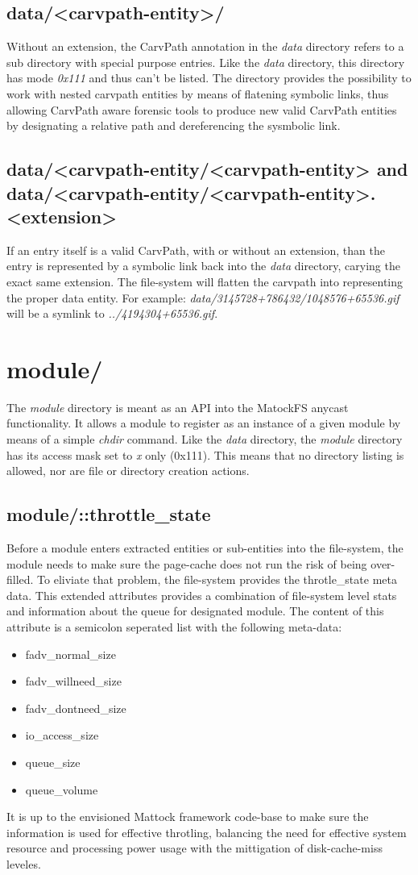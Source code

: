 \subsection{data/<carvpath-entity>/}
Without an extension, the CarvPath annotation in the \emph{data} directory refers to a sub directory with special purpose entries. Like the \emph{data} directory, this directory has mode \emph{0x111} and thus can't be listed. The directory provides the possibility to work with nested carvpath entities by means of flatening symbolic links, thus allowing CarvPath aware forensic tools to produce new valid CarvPath entities by designating a relative path and dereferencing the sysmbolic link.
\subsection{data/<carvpath-entity/<carvpath-entity> and data/<carvpath-entity/<carvpath-entity>.<extension>}
If an entry itself is a valid CarvPath, with or without an extension, than the entry is represented by a symbolic link back into the \emph{data} directory, carying the exact same extension. The file-system will flatten the carvpath into representing the proper data entity. For example: \emph{data/3145728+786432/1048576+65536.gif} will be a symlink to \emph{../4194304+65536.gif}.
\section{module/}
The \emph{module} directory is meant as an API into the MatockFS anycast functionality. It allows a module to register as an instance of a given module by means of a simple \emph{chdir} command. Like the \emph{data} directory, the \emph{module} directory has its access mask set to \emph{x} only (0x111). This means that no directory listing is allowed, nor are file or directory creation actions.  
\subsection{module/::throttle\_state}
Before a module enters extracted entities or sub-entities into the file-system, the module needs to make sure the page-cache does not run the risk of being over-filled. To eliviate that problem, the file-system provides the throtle\_state meta data. This extended attributes provides a combination of file-system level stats and information about the queue for designated module. The content of this attribute is a semicolon seperated list with the following meta-data:
\begin{itemize}
\item fadv\_normal\_size
\item fadv\_willneed\_size
\item fadv\_dontneed\_size
\item io\_access\_size
\item queue\_size
\item queue\_volume
\end{itemize}
It is up to the envisioned Mattock framework code-base to make sure the information is used for effective throtling, balancing the need for effective system resource and processing power usage with the mittigation of disk-cache-miss leveles.
